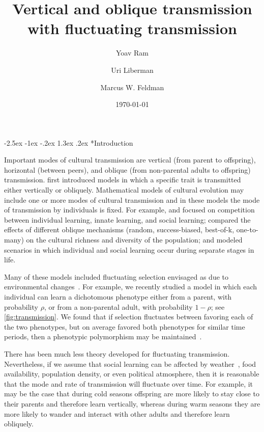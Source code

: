 \documentclass[12pt]{extarticle} %
\title{Vertical and oblique transmission with fluctuating transmission}
\author[a]{Yoav Ram}
\author[b]{Uri Liberman}
\author[a]{Marcus W. Feldman}
\affil[a]{Department of Biology, Stanford University, Stanford, CA}
\affil[b]{School of Mathematical Sciences, Tel Aviv University, Israel}
\date{\today}
\makeatletter
\renewcommand\section{\@startsection {section}{1}{\z@}%
     {-2.5ex \@plus -1ex \@minus -.2ex}%
     {1.3ex \@plus.2ex}%
    {\Large\bfseries}}
\makeatother
\begin{document}
\maketitle


\section*{Introduction}

Important modes of cultural transmission are vertical (from parent to offspring), horizontal (between peers), and oblique (from non-parental adults to offspring) transmission. 
\citet[ch.~3]{Cavalli-Sforza1981} first introduced models in which a specific trait is transmitted either vertically or obliquely.
Mathematical models of cultural evolution may include one or more modes of cultural transmission and in these models the mode of transmission by individuals is fixed. 
For example, \cite{Aoki2005} and \citet{McElreath2008} focused on competition between individual learning, innate learning, and social learning; \citet{Fogarty2017} compared the effects of different oblique mechanisms (random, success-biased, best-of-k, one-to-many) on the cultural richness and diversity of the population; and \citet{Aoki2012} modeled scenarios in which individual and social learning occur during separate stages in life.

Many of these models included fluctuating selection envisaged as due to environmental changes~\citep[reviewed in][]{Aoki2014}. 
For example, we recently studied a model in which each individual can learn a dichotomous phenotype either from a parent, with probability $\rho$, or from a non-parental adult, with probability $1-\rho$; see \autoref{fig:transmission}.
We found that if selection fluctuates between favoring each of the two phenotypes, but on average favored both phenotypes for similar time periods, then a phenotypic polymorphism may be maintained~\citep{Ram2018}.

There has been much less theory developed for fluctuating transmission.
Nevertheless, if we assume that social learning can be affected by weather~\citep{Phithakkitnukoon2012}, food availability, population density, or even political atmosphere, then it is reasonable that the mode and rate of transmission will fluctuate over time. 
For example, it may be the case that during cold seasons offspring are more likely to stay close to their parents and therefore learn vertically, whereas during warm seasons they are more likely to wander and interact with other adults and therefore learn obliquely.
\end{document}
